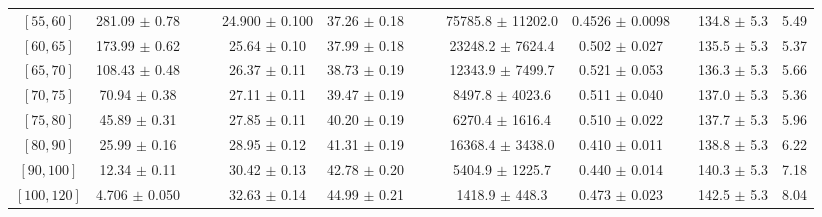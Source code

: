 \begin{tabular}{c||c|c|c|c|c|c|c|c|c|c|c||c}
$[55, 60]$ & 281.09 $\pm$ 0.78 &  &  & 24.900 $\pm$ 0.100 & 37.26 $\pm$ 0.18 &  &  & 75785.8 $\pm$ 11202.0 & 0.4526 $\pm$ 0.0098 &  & 134.8 $\pm$ 5.3 & 5.49\\
$[60, 65]$ & 173.99 $\pm$ 0.62 &  &  & 25.64 $\pm$ 0.10 & 37.99 $\pm$ 0.18 &  &  & 23248.2 $\pm$ 7624.4 & 0.502 $\pm$ 0.027 &  & 135.5 $\pm$ 5.3 & 5.37\\
$[65, 70]$ & 108.43 $\pm$ 0.48 &  &  & 26.37 $\pm$ 0.11 & 38.73 $\pm$ 0.19 &  &  & 12343.9 $\pm$ 7499.7 & 0.521 $\pm$ 0.053 &  & 136.3 $\pm$ 5.3 & 5.66\\
$[70, 75]$ & 70.94 $\pm$ 0.38 &  &  & 27.11 $\pm$ 0.11 & 39.47 $\pm$ 0.19 &  &  & 8497.8 $\pm$ 4023.6 & 0.511 $\pm$ 0.040 &  & 137.0 $\pm$ 5.3 & 5.36\\
$[75, 80]$ & 45.89 $\pm$ 0.31 &  &  & 27.85 $\pm$ 0.11 & 40.20 $\pm$ 0.19 &  &  & 6270.4 $\pm$ 1616.4 & 0.510 $\pm$ 0.022 &  & 137.7 $\pm$ 5.3 & 5.96\\
$[80, 90]$ & 25.99 $\pm$ 0.16 &  &  & 28.95 $\pm$ 0.12 & 41.31 $\pm$ 0.19 &  &  & 16368.4 $\pm$ 3438.0 & 0.410 $\pm$ 0.011 &  & 138.8 $\pm$ 5.3 & 6.22\\
$[90, 100]$ & 12.34 $\pm$ 0.11 &  &  & 30.42 $\pm$ 0.13 & 42.78 $\pm$ 0.20 &  &  & 5404.9 $\pm$ 1225.7 & 0.440 $\pm$ 0.014 &  & 140.3 $\pm$ 5.3 & 7.18\\
$[100, 120]$ & 4.706 $\pm$ 0.050 &  &  & 32.63 $\pm$ 0.14 & 44.99 $\pm$ 0.21 &  &  & 1418.9 $\pm$ 448.3 & 0.473 $\pm$ 0.023 &  & 142.5 $\pm$ 5.3 & 8.04\\
\end{tabular}
